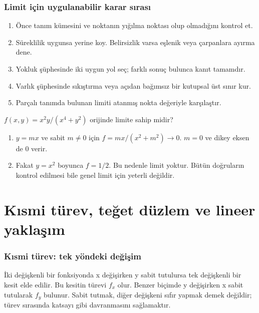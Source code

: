 \section{Limit için uygulanabilir karar sırası}
\begin{enumerate}
\item Önce tanım kümesini ve noktanın yığılma noktası olup olmadığını kontrol et.
\item Süreklilik uygunsa yerine koy. Belirsizlik varsa eşlenik veya çarpanlara ayırma dene.
\item Yokluk şüphesinde iki uygun yol seç; farklı sonuç bulunca kanıt tamamdır.
\item Varlık şüphesinde sıkıştırma veya açıdan bağımsız bir kutupsal üst sınır kur.
\item Parçalı tanımda bulunan limiti atanmış nokta değeriyle karşılaştır.
\end{enumerate}
\begin{tcolorbox}[title={Örnek 4.14 | Bütün doğruların aynı sonucu vermesi yetmez},colframe=accent]\(f(x,y)=x^2y/(x^4+y^2)\) orijinde limite sahip midir?
\par\vspace{1mm}{\scriptsize\sffamily Pekiştirme}\end{tcolorbox}
\begin{tcolorbox}[title={Adım adım çözüm},colback=green!3!white,colframe=green]\begin{enumerate}
\item \(y=mx\) ve sabit \(m\ne0\) için \(f=mx/(x^2+m^2)\to0\). \(m=0\) ve dikey eksen de 0 verir.
\item Fakat \(y=x^2\) boyunca \(f=1/2\). Bu nedenle limit yoktur. Bütün doğruların kontrol edilmesi bile genel limit için yeterli değildir.
\end{enumerate}\end{tcolorbox}
\clearpage\part{Kısmi türev, teğet düzlem ve lineer yaklaşım}
\section{Kısmi türev: tek yöndeki değişim}
İki değişkenli bir fonksiyonda x değişirken y sabit tutulursa tek değişkenli bir kesit elde edilir. Bu kesitin türevi \(f_x\) olur. Benzer biçimde y değişirken x sabit tutularak \(f_y\) bulunur. Sabit tutmak, diğer değişkeni sıfır yapmak demek değildir; türev sırasında katsayı gibi davranmasını sağlamaktır.


